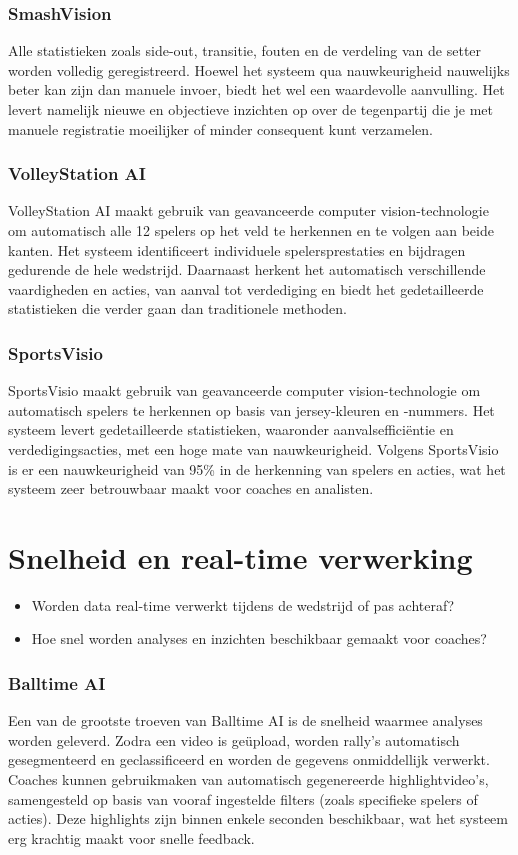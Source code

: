 \subsubsection{SmashVision}
Alle statistieken zoals side-out, transitie, fouten en de verdeling van de setter worden volledig geregistreerd. Hoewel het systeem qua nauwkeurigheid nauwelijks beter kan zijn dan manuele invoer, biedt het wel een waardevolle aanvulling. Het levert namelijk nieuwe en objectieve inzichten op over de tegenpartij die je met manuele registratie moeilijker of minder consequent kunt verzamelen. \autocite{Doren2025}
\subsubsection{VolleyStation AI}
VolleyStation AI maakt gebruik van geavanceerde computer vision-technologie om automatisch alle 12 spelers op het veld te herkennen en te volgen aan beide kanten. Het systeem identificeert individuele spelersprestaties en bijdragen gedurende de hele wedstrijd. Daarnaast herkent het automatisch verschillende vaardigheden en acties, van aanval tot verdediging en biedt het gedetailleerde statistieken die verder gaan dan traditionele methoden. \autocite{VolleyStationAI2025}
\subsubsection{SportsVisio}
SportsVisio maakt gebruik van geavanceerde computer vision-technologie om automatisch spelers te herkennen op basis van jersey-kleuren en -nummers. Het systeem levert gedetailleerde statistieken, waaronder aanvalsefficiëntie en verdedigingsacties, met een hoge mate van nauwkeurigheid. \autocite{SportsVisio2025} Volgens SportsVisio is er een nauwkeurigheid van 95\% in de herkenning van spelers en acties, wat het systeem zeer betrouwbaar maakt voor coaches en analisten. \autocite{Basaranlar2025}

\section{Snelheid en real-time verwerking}
\begin{itemize}
  \item Worden data real-time verwerkt tijdens de wedstrijd of pas achteraf?
  \item Hoe snel worden analyses en inzichten beschikbaar gemaakt voor coaches?
\end{itemize}
\subsubsection{Balltime AI}
Een van de grootste troeven van Balltime AI is de snelheid waarmee analyses worden geleverd. Zodra een video is geüpload, worden rally’s automatisch gesegmenteerd en geclassificeerd en worden de gegevens onmiddellijk verwerkt. Coaches kunnen gebruikmaken van automatisch gegenereerde highlightvideo’s, samengesteld op basis van vooraf ingestelde filters (zoals specifieke spelers of acties). Deze highlights zijn binnen enkele seconden beschikbaar, wat het systeem erg krachtig maakt voor snelle feedback. \autocite{BalltimeAI2025}

